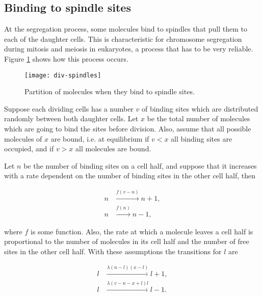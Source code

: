 \subsection{Binding to spindle sites}

At the segregation process, some molecules bind to spindles that pull them to each of the daughter cells. This is characteristic for chromosome segregation during mitosis and meiosis in eukaryotes, a process that has to be very reliable. Figure \ref{fig:div-spindles} shows how this process occurs.

\begin{figure}[H]
  \centering
  \texttt{[image: div-spindles]}
  \caption[Partition of molecules when they bind to spindle sites]{\label{fig:div-spindles} Partition of molecules when they bind to spindle sites.}
\end{figure}

Suppose each dividing cells has a number $v$ of binding sites which are distributed randomly between both daughter cells. Let $x$ be the total number of molecules which are going to bind the sites before division. Also, assume that all possible molecules of $x$ are bound, i.e. at equilibrium if $v<x$ all binding sites are occupied, and if $v>x$ all molecules are bound.

Let $n$ be the number of binding sites on a cell half, and suppose that it increases with a rate dependent on the number of binding sites in the other cell half, then

\begin{equation*}
  \begin{split}
    n&\xrightarrow{f(v-n)}n+1,\\
    n&\xrightarrow{f(n)}n-1,
  \end{split}
\end{equation*}

where $f$ is some function. Also, the rate at which a molecule leaves a cell half is proportional to the number of molecules in its cell half and the number of free sites in the other cell half. With these assumptions the transitions for $l$ are

\begin{equation*}
  \begin{split}
    l&\xrightarrow{\lambda(n-l)(x-l)}l+1,\\
    l&\xrightarrow{\lambda(v-n-x+l)l}l-1.
  \end{split}
\end{equation*}

